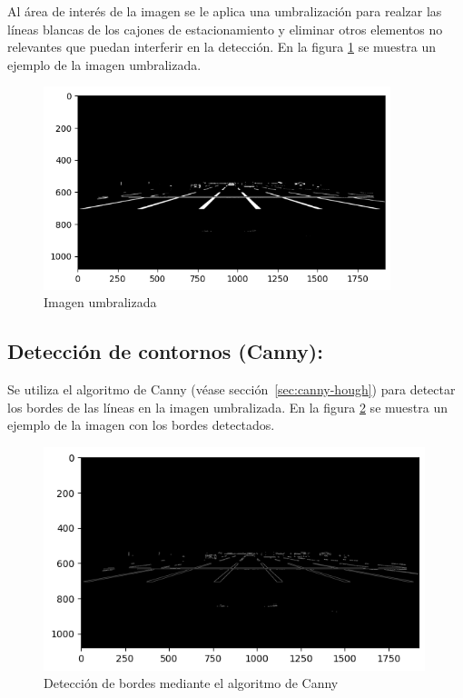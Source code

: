 Al área de interés de la imagen se le aplica una umbralización para realzar las líneas blancas de los cajones de estacionamiento
y eliminar otros elementos no relevantes que puedan interferir en la detección.
En la figura \ref{fig:threshold} se muestra un ejemplo de la imagen umbralizada.
\begin{figure}[!ht]
    \centering
    \includegraphics[width=0.9\textwidth]{img/reticule/thresholded}
    \caption{Imagen umbralizada}
    \label{fig:threshold}
\end{figure}

\subsection{Detección de contornos (Canny):}\label{sec:canny}

Se utiliza el algoritmo de Canny \cite{canny1986edge} (véase sección~\ref{sec:canny-hough}) para detectar los bordes de las líneas en la imagen umbralizada.
En la figura \ref{fig:edges} se muestra un ejemplo de la imagen con los bordes detectados.
\begin{figure}[!ht]
    \centering
    \includegraphics[width=0.99\textwidth]{img/reticule/canny}
    \caption{Detección de bordes mediante el algoritmo de Canny}
    \label{fig:edges}
\end{figure}

